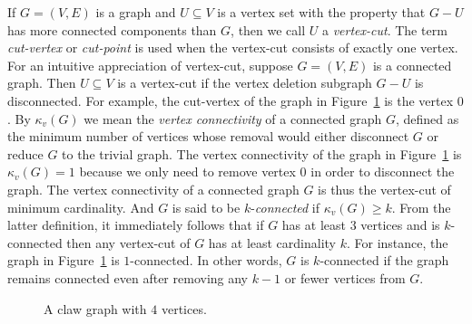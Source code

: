 If $G = (V,E)$ is a graph and $U \subseteq V$ is a vertex set with the
property that $G - U$ has more connected components than $G$, then we
call $U$ a \emph{vertex-cut}. The term
\emph{cut-vertex} or
\emph{cut-point} is used when the vertex-cut consists
of exactly one vertex. For an intuitive appreciation of vertex-cut,
suppose $G = (V,E)$ is a connected graph. Then $U \subseteq V$ is a
vertex-cut if the vertex deletion
subgraph $G - U$ is disconnected. For example, the cut-vertex of the
graph in Figure~\ref{fig:distance_connectivity:claw_graph} is the
vertex $0$. By $\kappa_v(G)$ we mean the
\emph{vertex connectivity} of a connected
graph $G$, defined as the minimum number of vertices whose removal
would either disconnect $G$ or reduce $G$ to the trivial graph. The
vertex connectivity of the graph in
Figure~\ref{fig:distance_connectivity:claw_graph} is
$\kappa_v(G) = 1$ because we only need to remove vertex $0$ in order
to disconnect the graph. The vertex connectivity of a connected graph
$G$ is thus the vertex-cut of minimum cardinality. And $G$ is said to
be $k$-\emph{connected} if $\kappa_v(G) \geq k$.
From the latter definition, it immediately follows that if $G$ has at
least $3$ vertices and is $k$-connected then any vertex-cut of $G$ has
at least cardinality $k$. For instance, the graph in
Figure~\ref{fig:distance_connectivity:claw_graph} is $1$-connected. In
other words, $G$ is $k$-connected if the graph remains connected even
after removing any $k - 1$ or fewer vertices from $G$.

\begin{figure}[!htbp]
\centering
{}

\caption{A claw graph with $4$ vertices.}
\label{fig:distance_connectivity:claw_graph}
\end{figure}

